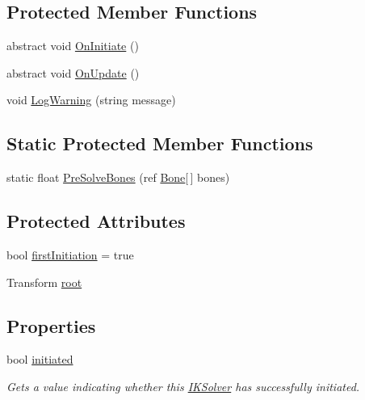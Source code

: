 \subsection*{Protected Member Functions}
\begin{DoxyCompactItemize}
\item 
abstract void \mbox{\hyperlink{class_root_motion_1_1_final_i_k_1_1_i_k_solver_a2a8cbf1dfed274fdbc79ff011c468cc6}{On\+Initiate}} ()
\item 
abstract void \mbox{\hyperlink{class_root_motion_1_1_final_i_k_1_1_i_k_solver_a3bbcc10c91d82ac266dadc63ea93171d}{On\+Update}} ()
\item 
void \mbox{\hyperlink{class_root_motion_1_1_final_i_k_1_1_i_k_solver_ac62ff5216c823725d5f9b03e18de9e5a}{Log\+Warning}} (string message)
\end{DoxyCompactItemize}
\subsection*{Static Protected Member Functions}
\begin{DoxyCompactItemize}
\item 
static float \mbox{\hyperlink{class_root_motion_1_1_final_i_k_1_1_i_k_solver_a30b719da674d049fd38830c3fc1dcdb1}{Pre\+Solve\+Bones}} (ref \mbox{\hyperlink{class_root_motion_1_1_final_i_k_1_1_i_k_solver_1_1_bone}{Bone}}\mbox{[}$\,$\mbox{]} bones)
\end{DoxyCompactItemize}
\subsection*{Protected Attributes}
\begin{DoxyCompactItemize}
\item 
bool \mbox{\hyperlink{class_root_motion_1_1_final_i_k_1_1_i_k_solver_ada80dafb158c170cf4475b1727fb6937}{first\+Initiation}} = true
\item 
Transform \mbox{\hyperlink{class_root_motion_1_1_final_i_k_1_1_i_k_solver_add558b38f163259934c37a0f1b497c06}{root}}
\end{DoxyCompactItemize}
\subsection*{Properties}
\begin{DoxyCompactItemize}
\item 
bool \mbox{\hyperlink{class_root_motion_1_1_final_i_k_1_1_i_k_solver_ab25232fc4362b290dcd5ee1cfa96ef5e}{initiated}}
\begin{DoxyCompactList}\small\item\em Gets a value indicating whether this \mbox{\hyperlink{class_root_motion_1_1_final_i_k_1_1_i_k_solver}{I\+K\+Solver}} has successfully initiated. \end{DoxyCompactList}\end{DoxyCompactItemize}


